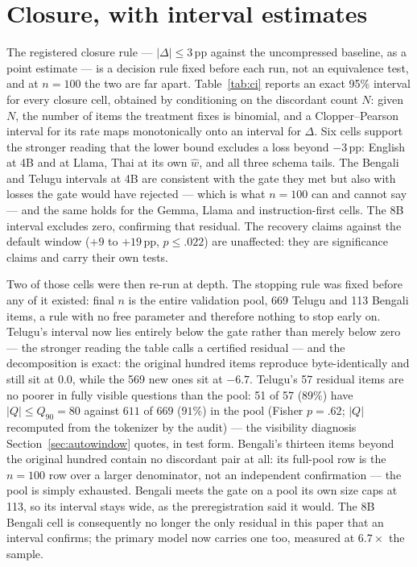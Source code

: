 \documentclass{article}
\begin{document}
\section{Closure, with interval estimates}
\label{app:ci}

The registered closure rule --- $|\Delta| \le 3$\,pp against the
uncompressed baseline, as a point estimate --- is a decision rule
fixed before each run, not an equivalence test, and at $n{=}100$ the
two are far apart. Table~\ref{tab:ci} reports an exact 95\% interval
for every closure cell, obtained by conditioning on the discordant
count $N$: given $N$, the number of items the treatment fixes is
binomial, and a Clopper--Pearson interval for its rate maps
monotonically onto an interval for $\Delta$. Six cells support the
stronger reading that the lower bound excludes a loss beyond
$-3$\,pp: English at 4B and at Llama, Thai at its own $\hat w$, and all
three schema tails. The
Bengali and Telugu intervals at 4B are consistent with the gate they met
but also with losses the gate would have rejected --- which is what
$n{=}100$ can and cannot say --- and the same holds for the Gemma, Llama
and instruction-first cells. The 8B interval excludes zero, confirming
that residual. The recovery claims against the default window ($+9$ to
$+19$\,pp, $p{\le}.022$) are unaffected: they are significance claims
and carry their own tests.

Two of those cells were then re-run at depth. The stopping rule was fixed
before any of it existed: final $n$ is the entire validation pool, 669
Telugu and 113 Bengali items, a rule with no free parameter and therefore
nothing to stop early on. Telugu's interval now lies entirely below the
gate rather than merely below zero --- the stronger reading the table
calls a certified residual --- and the decomposition is exact: the
original hundred items reproduce byte-identically and still sit at $0.0$,
while the 569 new ones sit at $-6.7$. Telugu's 57 residual items are no
poorer in fully visible questions than the pool: 51 of 57 ($89\%$) have
$|Q| \le Q_{90}{=}80$ against $611$ of $669$ ($91\%$) in the pool
(Fisher $p{=}.62$; $|Q|$ recomputed from the tokenizer by the audit)
--- the visibility diagnosis
Section~\ref{sec:autowindow} quotes, in test form. Bengali's thirteen items beyond the
original hundred contain no discordant pair at all: its full-pool row is
the $n{=}100$ row over a larger denominator, not an independent
confirmation --- the pool is simply exhausted. Bengali meets the gate on a pool
its own size caps at 113, so its interval stays wide, as the
preregistration said it would. The 8B Bengali cell is consequently no
longer the only residual in this paper that an interval confirms; the
primary model now carries one too, measured at $6.7\times$ the sample.
\end{document}

